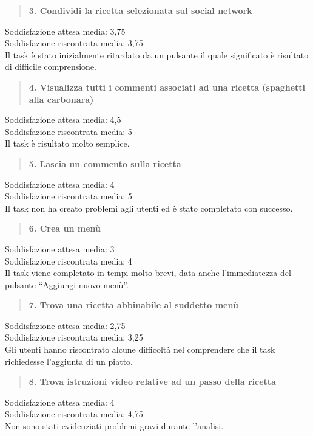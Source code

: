 \begin{quote}
	\textbf{3. Condividi la ricetta selezionata sul social network}
\end{quote}
Soddisfazione attesa media: 3,75\\
Soddisfazione riscontrata media: 3,75\\
Il task è stato inizialmente ritardato da un pulsante il quale significato è
risultato di difficile comprensione.

\begin{quote}
	\textbf{4. Visualizza tutti i commenti associati ad una ricetta (spaghetti
	 alla carbonara)}
\end{quote}
Soddisfazione attesa media: 4,5\\
Soddisfazione riscontrata media: 5\\
Il task è risultato molto semplice.

\begin{quote}
	\textbf{5. Lascia un commento sulla ricetta}
\end{quote}
Soddisfazione attesa media: 4\\
Soddisfazione riscontrata media: 5\\
Il task non ha creato problemi agli utenti ed è stato completato con successo.

\begin{quote}
	\textbf{6. Crea un menù}
\end{quote}
Soddisfazione attesa media: 3\\
Soddisfazione riscontrata media: 4\\
Il task viene completato in tempi molto brevi, data anche l'immediatezza del
pulsante ``Aggiungi nuovo menù''.

\begin{quote}
	\textbf{7. Trova una ricetta abbinabile al suddetto menù}
\end{quote}
Soddisfazione attesa media: 2,75\\
Soddisfazione riscontrata media: 3,25\\
Gli utenti hanno riscontrato alcune difficoltà nel comprendere che il task
richiedesse l'aggiunta di un piatto.

\begin{quote}
	\textbf{8. Trova istruzioni video relative ad un passo della ricetta}
\end{quote}
Soddisfazione attesa media: 4\\
Soddisfazione riscontrata media: 4,75\\
Non sono stati evidenziati problemi gravi durante l'analisi.

